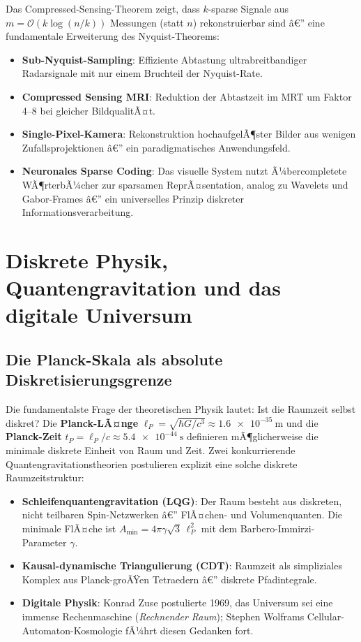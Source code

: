 ﻿\documentclass[12pt,a4paper,titlepage]{report}
\begin{document}
Das Compressed-Sensing-Theorem zeigt, dass $k$-sparse Signale aus
$m = \mathcal{O}(k \log(n/k))$ Messungen (statt $n$) rekonstruierbar sind â€”
eine fundamentale Erweiterung des Nyquist-Theorems:
\begin{itemize}[leftmargin=2em]
    \item \textbf{Sub-Nyquist-Sampling}: Effiziente Abtastung ultrabreitbandiger
        Radarsignale mit nur einem Bruchteil der Nyquist-Rate.
    \item \textbf{Compressed Sensing MRI}: Reduktion der Abtastzeit im MRT
        um Faktor 4--8 bei gleicher BildqualitÃ¤t.
    \item \textbf{Single-Pixel-Kamera}: Rekonstruktion hochaufgelÃ¶ster Bilder
        aus wenigen Zufallsprojektionen â€” ein paradigmatisches Anwendungsfeld.
    \item \textbf{Neuronales Sparse Coding}: Das visuelle System nutzt
        Ã¼bercompletete WÃ¶rterbÃ¼cher zur sparsamen ReprÃ¤sentation, analog zu
        Wavelets und Gabor-Frames â€” ein universelles Prinzip diskreter
        Informationsverarbeitung.
\end{itemize}

\section{Diskrete Physik, Quantengravitation und das digitale Universum}

\subsection{Die Planck-Skala als absolute Diskretisierungsgrenze}

Die fundamentalste Frage der theoretischen Physik lautet: Ist die Raumzeit
selbst diskret? Die \textbf{Planck-LÃ¤nge}
$\ell_P = \sqrt{\hbar G/c^3} \approx \SI{1.6e-35}{\meter}$
und die \textbf{Planck-Zeit} $t_P = \ell_P/c \approx \SI{5.4e-44}{\second}$
definieren mÃ¶glicherweise die minimale diskrete Einheit von Raum und Zeit.
Zwei konkurrierende Quantengravitationstheorien postulieren explizit eine
solche diskrete Raumzeitstruktur:
\begin{itemize}[leftmargin=2em]
    \item \textbf{Schleifenquantengravitation (LQG)}: Der Raum besteht aus
        diskreten, nicht teilbaren Spin-Netzwerken â€” FlÃ¤chen- und
        Volumenquanten. Die minimale FlÃ¤che ist $ A_{\min} = 4\pi\gamma\sqrt{3}\,\ell_P^2$
        mit dem Barbero-Immirzi-Parameter $\gamma$.
    \item \textbf{Kausal-dynamische Triangulierung (CDT)}: Raumzeit als
        simpliziales Komplex aus Planck-groÃŸen Tetraedern â€” diskrete Pfadintegrale.
    \item \textbf{Digitale Physik}: Konrad Zuse postulierte 1969, das Universum
        sei eine immense Rechenmaschine (\emph{Rechnender Raum}); Stephen Wolframs
        Cellular-Automaton-Kosmo\-logie fÃ¼hrt diesen Gedanken fort.
\end{itemize}
\end{document}
